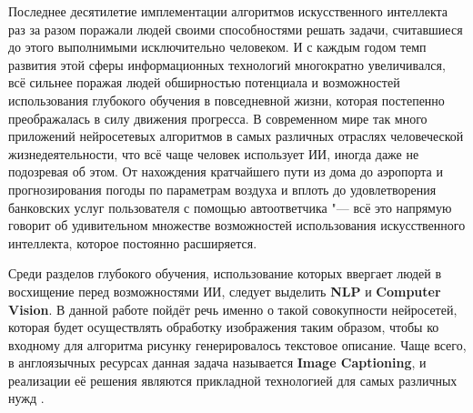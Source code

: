 \documentclass[bachelor, och, coursework]{SCWorks}
\begin{document}


\tableofcontents

\intro

    Последнее десятилетие имплементации алгоритмов искусственного интеллекта раз
    за разом поражали людей своими способностями решать задачи, считавшиеся до
    этого выполнимыми исключительно человеком. И с каждым годом темп развития
    этой сферы информационных технологий многократно увеличивался, всё сильнее
    поражая людей обширностью потенциала и возможностей использования глубокого
    обучения в повседневной жизни, которая постепенно преображалась в силу
    движения прогресса. В современном мире так много приложений нейросетевых
    алгоритмов в самых различных отраслях человеческой жизнедеятельности, что
    всё чаще человек использует ИИ, иногда даже не подозревая об этом. От
    нахождения кратчайшего пути из дома до аэропорта и прогнозирования погоды по
    параметрам воздуха и вплоть до удовлетворения банковских услуг пользователя
    с помощью автоответчика "--- всё это напрямую говорит об удивительном
    множестве возможностей использования искусственного интеллекта, которое
    постоянно расширяется.
    
    Среди разделов глубокого обучения, использование которых ввергает людей в
    восхищение перед возможностями ИИ, следует выделить \textbf{NLP} и
    \textbf{Computer Vision}. В данной работе пойдёт речь именно о такой
    совокупности нейросетей, которая будет осуществлять обработку изображения
    таким образом, чтобы ко входному для алгоритма рисунку генерировалось
    текстовое описание. Чаще всего, в англоязычных ресурсах данная задача
    называется \textbf{Image Captioning}, и реализации её решения являются
    прикладной технологией для самых различных нужд \cite{neur}.

\end{document}

